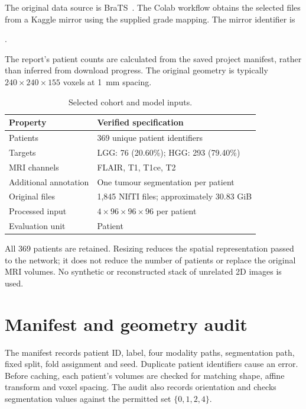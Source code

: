 \documentclass[12pt,a4paper,oneside]{report}
\begin{document}
The original data source is BraTS~\cite{brats2020,menze,bakas}. The Colab workflow obtains the selected files from a Kaggle mirror using the supplied grade mapping. The mirror identifier is\par\smallskip
{}.\par\smallskip
The report's patient counts are calculated from the saved project manifest, rather than inferred from download progress. The original geometry is typically $240\times240\times155$ voxels at 1~mm spacing.

\begin{table}[htbp]
\centering
\caption{Selected cohort and model inputs.}
\label{tab:cohort}
\begin{tabularx}{\linewidth}{lY}
\toprule
Property & Verified specification\\\midrule
Patients & 369 unique patient identifiers\\
Targets & LGG: 76 (20.60\%); HGG: 293 (79.40\%)\\
MRI channels & FLAIR, T1, T1ce, T2\\
Additional annotation & One tumour segmentation per patient\\
Original files & 1,845 NIfTI files; approximately 30.83 GiB\\
Processed input & $4\times96\times96\times96$ per patient\\
Evaluation unit & Patient\\\bottomrule
\end{tabularx}
\end{table}

All 369 patients are retained. Resizing reduces the spatial representation passed to the network; it does not reduce the number of patients or replace the original MRI volumes. No synthetic or reconstructed stack of unrelated 2D images is used.

\section{Manifest and geometry audit}
The manifest records patient ID, label, four modality paths, segmentation path, fixed split, fold assignment and seed. Duplicate patient identifiers cause an error. Before caching, each patient's volumes are checked for matching shape, affine transform and voxel spacing. The audit also records orientation and checks segmentation values against the permitted set $\{0,1,2,4\}$.
\end{document}
